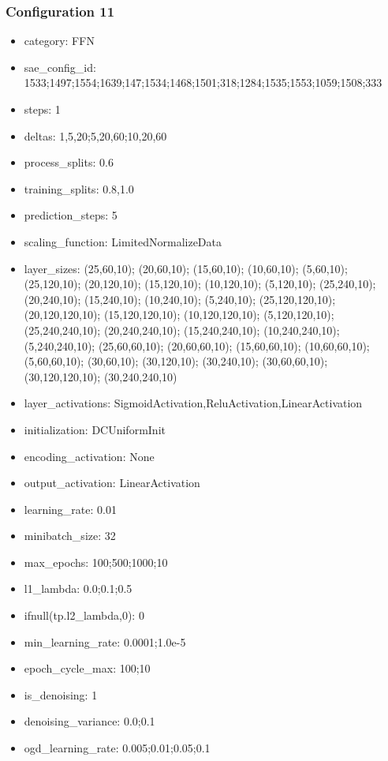\documentclass[a4paper,11pt,oneside]{article}
\theoremstyle{plain}
\theoremstyle{definition}
\begin{document}
	\subsubsection{Configuration 11}\label{config11}
	\begin{itemize}
		\item category: FFN
		\item sae\_config\_id: 1533;1497;1554;1639;147;1534;1468;1501;318;1284;1535;1553;1059;1508;333
		\item steps: 1
		\item deltas: 1,5,20;5,20,60;10,20,60
		\item process\_splits: 0.6
		\item training\_splits: 0.8,1.0
		\item prediction\_steps: 5
		\item scaling\_function: LimitedNormalizeData
		\item layer\_sizes: (25,60,10); (20,60,10); (15,60,10); (10,60,10); (5,60,10); (25,120,10); (20,120,10); (15,120,10); (10,120,10); (5,120,10); (25,240,10); (20,240,10); (15,240,10); (10,240,10); (5,240,10); (25,120,120,10); (20,120,120,10); (15,120,120,10); (10,120,120,10); (5,120,120,10); (25,240,240,10); (20,240,240,10); (15,240,240,10); (10,240,240,10); (5,240,240,10); (25,60,60,10); (20,60,60,10); (15,60,60,10); (10,60,60,10); (5,60,60,10); (30,60,10); (30,120,10); (30,240,10); (30,60,60,10); (30,120,120,10); (30,240,240,10)
		\item layer\_activations: SigmoidActivation,ReluActivation,LinearActivation
		\item initialization: DCUniformInit
		\item encoding\_activation: None
		\item output\_activation: LinearActivation
		\item learning\_rate: 0.01
		\item minibatch\_size: 32
		\item max\_epochs: 100;500;1000;10
		\item l1\_lambda: 0.0;0.1;0.5
		\item ifnull(tp.l2\_lambda,0): 0
		\item min\_learning\_rate: 0.0001;1.0e-5
		\item epoch\_cycle\_max: 100;10
		\item is\_denoising: 1
		\item denoising\_variance: 0.0;0.1
		\item ogd\_learning\_rate: 0.005;0.01;0.05;0.1
	\end{itemize}
	
\end{document}
